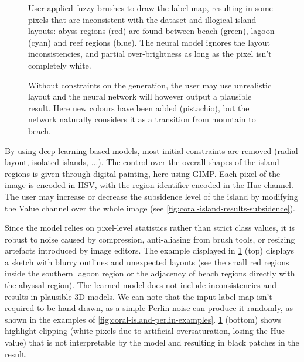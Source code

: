 \begin{figure}
    \caption{User applied fuzzy brushes to draw the label map, resulting in some pixels that are inconsistent with the dataset and illogical island layouts: abyss regions (red) are found between beach (green), lagoon (cyan) and reef regions (blue). The neural model ignores the layout inconsistencies, and partial over-brightness as long as the pixel isn't completely white.}
    \label{fig:coral-island-results-fuzzy}
\end{figure}
\begin{figure}
    \caption{Without constraints on the generation, the user may use unrealistic layout and the neural network will however output a plausible result. Here new colours have been added (pistachio), but the network naturally considers it as a transition from mountain to beach.}
    \label{fig:coral-island-results_dino}
\end{figure}

By using deep-learning-based models, most initial constraints are removed (radial layout, isolated islands, ...). The control over the overall shapes of the island regions is given through digital painting, here using GIMP. Each pixel of the image is encoded in HSV, with the region identifier encoded in the Hue channel. The user may increase or decrease the subsidence level of the island by modifying the Value channel over the whole image (see \cref{fig:coral-island-results-subsidence}).

Since the model relies on pixel-level statistics rather than strict class values, it is robust to noise caused by compression, anti-aliasing from brush tools, or resizing artefacts introduced by image editors. The example displayed in \cref{fig:coral-island-results-fuzzy} (top) displays a sketch with blurry outlines and unexpected layouts (see the small red regions inside the southern lagoon region or the adjacency of beach regions directly with the abyssal region). The learned model does not include inconsistencies and results in plausible 3D models. We can note that the input label map isn't required to be hand-drawn, as a simple Perlin noise can produce it randomly, as shown in the examples of \cref{fig:coral-island-perlin-examples}. \cref{fig:coral-island-results-fuzzy} (bottom) shows highlight clipping (white pixels due to artificial oversaturation, losing the Hue value) that is not interpretable by the model and resulting in black patches in the result. 

